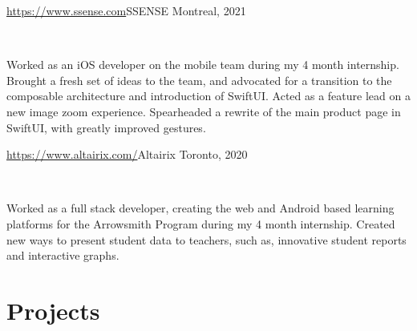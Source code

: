 \documentclass[]{style}
\begin{document}
\begin{entrylist}


\vspace{2mm}

\entry
{\url{https://www.ssense.com}{SSENSE}\vspace{1mm}}
{Montreal, 2021}
{ ~ \vspace{-2.5mm}

    

Worked as an iOS developer on the mobile team during my 4 month internship. Brought a fresh set of ideas to the team, and advocated for a transition to the composable architecture and introduction of SwiftUI. Acted as a feature lead on a new image zoom experience. Spearheaded a rewrite of the main product page in SwiftUI, with greatly improved gestures.}

%
%
%


\entry
{\url{https://www.altairix.com/}{Altairix} \vspace{1mm}}
{Toronto, 2020}
{ ~ \vspace{-2.5mm}

  

Worked as a full stack developer, creating the web and Android based learning platforms for the Arrowsmith Program during my 4 month internship. Created new ways to present student data to teachers, such as, innovative student reports and interactive graphs.}

\end{entrylist}



\section{Projects}
\end{document}
